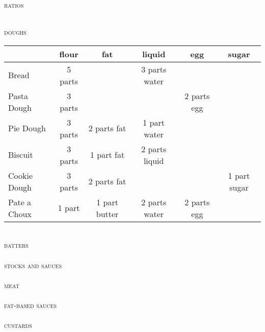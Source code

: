 \documentclass[letterpaper,11pt]{article}
\newcommand{\sectionheader}[1]{
    ~\\
    {\small\textsc{#1}} \\
}
\begin{document}
\normalsize

{\huge\scshape{ratios}}

\sectionheader{doughs}
\begin{tabular}{ l c c c c c }
~ & flour & fat & liquid & egg & sugar \\
\hline
Bread & 5 parts & & 3 parts water \\
Pasta Dough & 3 parts & & & 2 parts egg \\
Pie Dough & 3 parts & 2 parts fat & 1 part water \\
Biscuit & 3 parts & 1 part fat & 2 parts liquid \\
Cookie Dough & 3 parts & 2 parts fat & & & 1 part sugar \\
Pate a Choux & 1 part & 1 part butter & 2 parts water & 2 parts egg \\
\end{tabular}

\sectionheader{batters}
\sectionheader{stocks and sauces}
\sectionheader{meat}
\sectionheader{fat-based sauces}
\sectionheader{custards}
\end{document}
